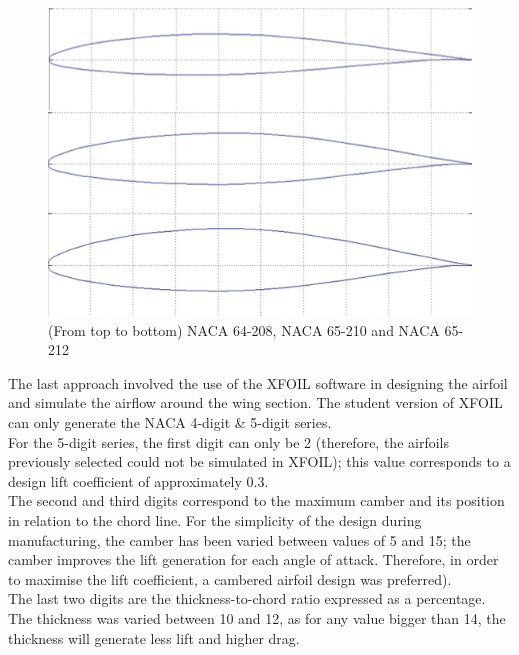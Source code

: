 \documentclass[12pt]{article}
\begin{document}
\begin{figure}[h]
    \includegraphics[scale=1]{NACAs.png}
    \centering
    \caption{(From top to bottom) NACA 64-208, NACA 65-210 and NACA 65-212}
    \label{fig:nacas}
\end{figure}

\noindent The last approach involved the use of the XFOIL software in designing the airfoil and simulate the airflow around the wing section. The student version of XFOIL can only generate the NACA 4-digit \& 5-digit series. \\

\noindent For the 5-digit series, the first digit can only be 2 (therefore, the airfoils previously selected could not be simulated in XFOIL); this value corresponds to a design lift coefficient of approximately 0.3. \\

\noindent The second and third digits correspond to the maximum camber and its position in relation to the chord line. For the simplicity of the design during manufacturing, the camber has been varied between values of 5 and 15; the camber improves the lift generation for each angle of attack. Therefore, in order to maximise the lift coefficient, a cambered airfoil design was preferred). \\

\noindent The last two digits are the thickness-to-chord ratio expressed as a percentage. The thickness was varied between 10 and 12, as for any value bigger than 14, the thickness will generate less lift and higher drag. \\
\end{document}
